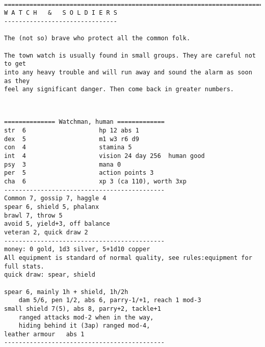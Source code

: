 \








\goodbreak
{}


\goodbreak \begin{samepage} \small \begin{verbatim}
================================================================================
W A T C H   &   S O L D I E R S
-------------------------------

The (not so) brave who protect all the common folk.

The town watch is usually found in small groups. They are careful not to get 
into any heavy trouble and will run away and sound the alarm as soon as they 
feel any significant danger. Then come back in greater numbers.
\end{verbatim} \normalsize \end{samepage}

\

\goodbreak \begin{samepage} \small \begin{verbatim}
============== Watchman, human =============
str  6                    hp 12 abs 1
dex  5                    m1 w3 r6 d9
con  4                    stamina 5
int  4                    vision 24 day 256  human good
psy  3                    mana 0
per  5                    action points 3
cha  6                    xp 3 (ca 110), worth 3xp
--------------------------------------------
Common 7, gossip 7, haggle 4
spear 6, shield 5, phalanx
brawl 7, throw 5
avoid 5, yield+3, off balance
veteran 2, quick draw 2
--------------------------------------------
money: 0 gold, 1d3 silver, 5+1d10 copper
All equipment is standard of normal quality, see rules:equipment for full stats.
quick draw: spear, shield

spear 6, mainly 1h + shield, 1h/2h
    dam 5/6, pen 1/2, abs 6, parry-1/+1, reach 1 mod-3
small shield 7(5), abs 8, parry+2, tackle+1
    ranged attacks mod-2 when in the way,
    hiding behind it (3ap) ranged mod-4,
leather armour   abs 1
--------------------------------------------
\end{verbatim} \normalsize \end{samepage}

